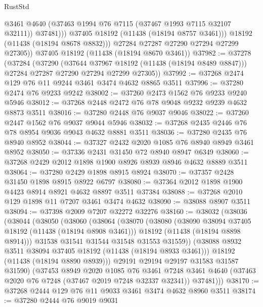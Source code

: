 \begin{lexlean}{RustStd}
\begin{coremodule}
                  @3461
                  @4640
                  (@37463 @1994 @76 @7115 (@37467 @1993 @7115 @32107 @32111))
                  @37481)))
            @37405
            @18192
            (@11438 (@18194 @8757 @3461)))
          @18192
          (@11438 (@18194 @8678 @8832)))
        @27284
        @27287
        @27290
        @27294
        @27299
        @27305))
    @37405
    @18192
    (@11438 (@18194 @8670 @3461))
@37982 := @37278
    (@37284
      (@37290
        (@37644 @37967 @18192 (@11438 (@18194 @8489 @8847)))
        @27284
        @27287
        @27290
        @27294
        @27299
        @27305))
@37992 := @37268 @2474 @129 @76 @11 @9244 @3461 @3474 @4632 @8865 @3511
@37996 := @37280 @2474 @76 @9233 @9242
@38002 := @37260 @2473 @1562 @76 @9233 @9240 @5946
@38012 := @37268 @2448 @2472 @76 @78 @9048 @9232 @9239 @4632 @8873 @3511
@38016 := @37280 @2448 @76 @9037 @9046
@38022 := @37260 @2447 @1562 @76 @9037 @9044 @5946
@38032 := @37268 @2435 @2446 @76 @78 @8954 @9036 @9043 @4632 @8881 @3511
@38036 := @37280 @2435 @76 @8940 @8952
@38044 := @37327 @2432 @2020 @1085 @76 @8940 @8949 @3461 @8952
@38050 := @37336 @2431 @31450 @72 @8940 @8947 @6349
@38060 := @37268 @2429 @2012 @1898 @1900 @8926 @8939 @8946 @4632 @8889 @3511
@38064 := @37280 @2429 @1898 @8915 @8924
@38070 := @37357 @2428 @31450 @1898 @8915 @8922 @6797
@38080 := @37364 @2012 @1898 @1900 @4423 @8914 @8921 @4632 @8897 @3511 @37384
@38088 := @37268 @2010 @129 @1898 @11 @7207 @3461 @3474 @4632
@38090 := @38088 @8907 @3511
@38094 := @37398 @2009 @7207 @32272 @32276
@38160 := @38032
    (@38036
      (@38044
        (@38050
          (@38060
            (@38064
              (@38070
                (@38080
                  (@38090 @38094 @37405 @18192 (@11438 (@18194 @8908 @3461)))
                  @18192
                  (@11438 (@18194 @8898 @8914)))
                @31538
                @31541
                @31544
                @31548
                @31553
                @31559))
            (@38088 @8932 @3511 @38094 @37405 @18192 (@11438 (@18194 @8933 @3461)))
            @18192
            (@11438 (@18194 @8890 @8939)))
          @29191
          @29194
          @29197
          @31583
          @31587
          @31590)
        (@37453
          @8949
          @2020
          @1085
          @76
          @3461
          @7248
          @3461
          @4640
          (@37463 @2020 @76 @7248 (@37467 @2019 @7248 @32337 @32341))
          @37481)))
@38170 := @37268 @2444 @129 @76 @11 @9033 @3461 @3474 @4632 @8960 @3511
@38174 := @37280 @2444 @76 @9019 @9031

\end{coremodule}
\end{lexlean}
